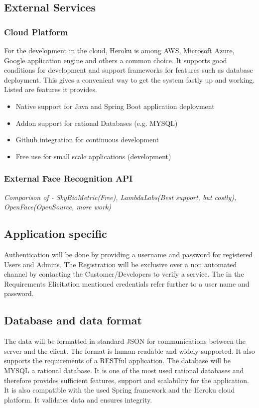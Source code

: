 \documentclass[a4paper,11pt]{article}
\begin{document}
\subsection{External Services}

\subsubsection{Cloud Platform}
For the development in the cloud, Heroku is among AWS, Microsoft Azure, Google application engine and others a common choice. It supports good conditions for development and support frameworks for features such as database deployment. This gives a convenient way to get the system fastly up and working. Listed are features it provides.
\begin{itemize}
\item Native support for Java and Spring Boot application deployment
\item Addon support for rational Databases (e.g. MYSQL)
\item Github integration for continuous development
\item Free use for small scale applications (development)
\end{itemize}

\subsubsection{External Face Recognition API}
\textit{Comparison of 
	- SkyBioMetric(Free), LambdaLabs(Best support, but costly), OpenFace(OpenSource, more work)} 
	
\subsection{Application specific}
Authentication will be done by providing a username and password for registered Users and Admins. The Registration will be exclusive over  a non automated channel by contacting the Customer/Developers to verify a service. The in the Requirements Elicitation mentioned credentials refer further to a user name and password.

\subsection{Database and data format}
The data will be formatted in standard JSON for communications between the server and the client. The format is human-readable and widely supported. It also supports the requirements of a RESTful application.
\newline
\newline
\noindent
The database will be MYSQL a rational database. 
It is one of the most used rational databases and therefore provides sufficient features, support and scalability for the application. It is also compatible with the used Spring framework and the Heroku cloud platform. It validates data and ensures integrity. 
\end{document}
